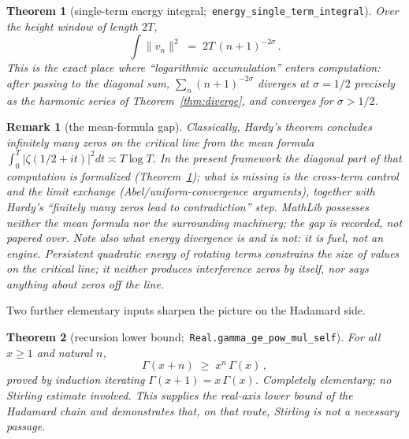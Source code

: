 \documentclass[submission]{jsfds}
\newtheorem{theorem}{Theorem}
\newtheorem*{remark}{Remark}
\newcommand{\Lean}[1]{\texttt{#1}}
\newcommand{\abs}[1]{\lvert #1\rvert}
\newcommand{\Norm}[1]{\lVert #1\rVert}
\begin{document}
\begin{theorem}[single-term energy integral;\,
\Lean{energy_single_term_integral}]\label{thm:energyint}
Over the height window of length $2T$,
\[
  \int \Norm{v_n}^{2} \;=\; 2T\,(n+1)^{-2\sigma}\, .
\]
This is the exact place where ``logarithmic accumulation'' enters computation:
after passing to the diagonal sum, $\sum_{n}(n+1)^{-2\sigma}$ diverges at
$\sigma=1/2$ precisely as the harmonic series of
Theorem~\ref{thm:diverge}, and converges for $\sigma>1/2$.
\end{theorem}

\begin{remark}[the mean-formula gap]\label{remark:mean}
Classically, Hardy's theorem \citep{Hardy1914} concludes infinitely many zeros
on the critical line from the mean formula
$\int_{0}^{T}\abs{\zeta(1/2+it)}^{2}dt\asymp T\log T$. In the present framework
the diagonal part of that computation is formalized
(Theorem~\ref{thm:energyint}); what is missing is the cross-term control and
the limit exchange (Abel/uniform-convergence arguments), together with Hardy's
``finitely many zeros lead to contradiction'' step. MathLib possesses neither
the mean formula nor the surrounding machinery; the gap is recorded, not
papered over. Note also what energy divergence is and is not: it is fuel, not an
engine. Persistent quadratic energy of rotating terms constrains the size of
values on the critical line; it neither produces interference zeros by itself,
nor says anything about zeros off the line.
\end{remark}

Two further elementary inputs sharpen the picture on the Hadamard side.

\begin{theorem}[recursion lower bound;\,
\Lean{Real.gamma_ge_pow_mul_self}]\label{thm:gamma}
For all $x\geq 1$ and natural $n$,
\[
  \Gamma(x+n) \;\geq\; x^{n}\,\Gamma(x)\, ,
\]
proved by induction iterating $\Gamma(x+1)=x\,\Gamma(x)$. Completely
elementary; no Stirling estimate involved. This supplies the real-axis lower
bound of the Hadamard chain and demonstrates that, on that route, Stirling is
not a necessary passage.
\end{theorem}
\end{document}
